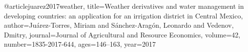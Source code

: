 @article{juarez2017weather,
  title={Weather derivatives and water management in developing countries: an application for an irrigation district in Central Mexico},
  author={Ju{\'a}rez-Torres, Miriam and S{\'a}nchez-Arag{\'o}n, Leonardo and Vedenov, Dmitry},
  journal={Journal of Agricultural and Resource Economics},
  volume={42},
  number={1835-2017-644},
  ages={146--163},
  year={2017}
}